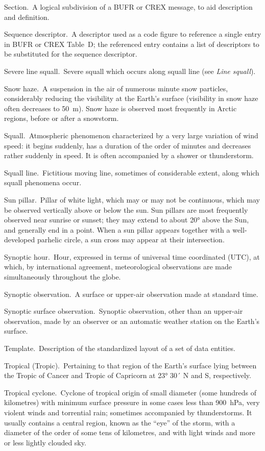 Section. A logical subdivision of a BUFR or CREX message, to aid description and definition.

Sequence descriptor. A descriptor used as a code figure to reference a single entry in BUFR or CREX Table~D; the referenced entry contains a list of descriptors to be substituted for the sequence descriptor.

Severe line squall. Severe squall which occurs along squall line (see \emph{Line squall}).

Snow haze. A suspension in the air of numerous minute snow particles, considerably reducing the visibility at the Earth's surface (visibility in snow haze often decreases to 50~m). Snow haze is observed most frequently in Arctic regions, before or after a snowstorm.

Squall. Atmospheric phenomenon characterized by a very large variation of wind speed: it begins suddenly, has a duration of the order of minutes and decreases rather suddenly in speed. It is often accompanied by a shower or thunderstorm.

Squall line. Fictitious moving line, sometimes of considerable extent, along which squall phenomena occur.

Sun pillar. Pillar of white light, which may or may not be continuous, which may be observed vertically above or below the sun. Sun pillars are most frequently observed near sunrise or sunset; they may extend to about 20° above the Sun, and generally end in a point. When a sun pillar appears together with a well-developed parhelic circle, a sun cross may appear at their intersection.

Synoptic hour. Hour, expressed in terms of universal time coordinated (UTC), at which, by international agreement, meteorological observations are made simultaneously throughout the globe.

Synoptic observation. A surface or upper-air observation made at standard time.

Synoptic surface observation. Synoptic observation, other than an upper-air observation, made by an observer or an automatic weather station on the Earth's surface.

Template. Description of the standardized layout of a set of data entities.

Tropical (Tropic). Pertaining to that region of the Earth's surface lying between the Tropic of Cancer and Tropic of Capricorn at 23° 30´ N and S, respectively.

Tropical cyclone. Cyclone of tropical origin of small diameter (some hundreds of kilometres) with minimum surface pressure in some cases less than 900~hPa, very violent winds and torrential rain; sometimes accompanied by thunderstorms. It usually contains a central region, known as the ``eye'' of the storm, with a diameter of the order of some tens of kilometres, and with light winds and more or less lightly clouded sky.

